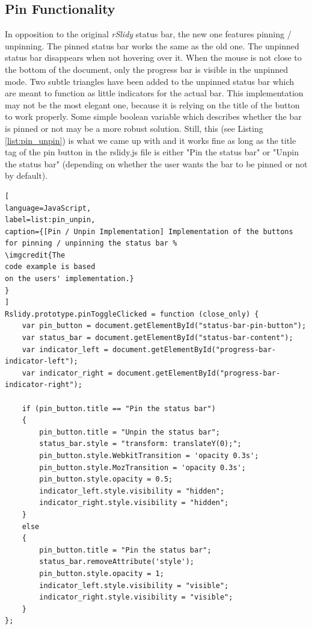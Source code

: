 \subsection{Pin Functionality}
In opposition to the original \textit{rSlidy} status bar, the new one features pinning / unpinning. The pinned status bar works the same as the old one. The unpinned status bar disappears when not hovering over it. When the mouse is not close to the bottom of the document, only the progress bar is visible in the unpinned mode. Two subtle triangles have been added to the unpinned status bar which are meant to function as little indicators for the actual bar. This implementation may not be the most elegant one, because it is relying on the title of the button to work properly. Some simple boolean variable which describes whether the bar is pinned or not may be a more robust solution. Still, this (see Listing \ref{list:pin_unpin}) is what we came up with and it works fine as long as the title tag of the pin button in the rslidy.js file is either "Pin the status bar" or "Unpin the status bar" (depending on whether the user wants the bar to be pinned or not by default).


\begin{minipage}{\linewidth}
\begin{lstlisting}[
language=JavaScript,
label=list:pin_unpin,
caption={[Pin / Unpin Implementation] Implementation of the buttons for pinning / unpinning the status bar %
\imgcredit{The 
code example is based 
on the users' implementation.}
}
]
Rslidy.prototype.pinToggleClicked = function (close_only) {
	var pin_button = document.getElementById("status-bar-pin-button");
	var status_bar = document.getElementById("status-bar-content");
	var indicator_left = document.getElementById("progress-bar-indicator-left");
	var indicator_right = document.getElementById("progress-bar-indicator-right");

	if (pin_button.title == "Pin the status bar")
	{
		pin_button.title = "Unpin the status bar";
		status_bar.style = "transform: translateY(0);";
		pin_button.style.WebkitTransition = 'opacity 0.3s';
		pin_button.style.MozTransition = 'opacity 0.3s';
		pin_button.style.opacity = 0.5;
		indicator_left.style.visibility = "hidden";
		indicator_right.style.visibility = "hidden";
	}
	else
	{			
		pin_button.title = "Pin the status bar";
		status_bar.removeAttribute('style');
		pin_button.style.opacity = 1;
		indicator_left.style.visibility = "visible";
		indicator_right.style.visibility = "visible";
	}
};
\end{lstlisting}
\end{minipage}


